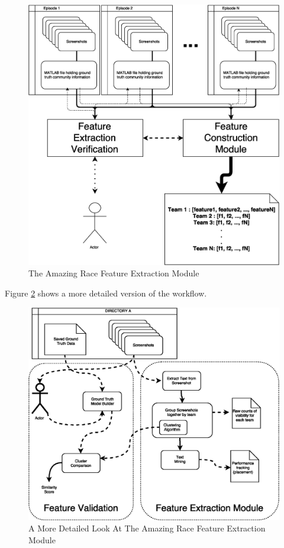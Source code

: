 \documentclass[10pt, twoside]{article}
\begin{document}
\label{section:FES}
\begin{figure}[H]
  \centering
  \includegraphics[width=\textwidth]{FeatureExtractionModule}
  \caption{The Amazing Race Feature Extraction Module}
  \label{fig:feature_extraction_module}
\end{figure}

Figure \ref{fig:feature_extraction_module_details} shows a more detailed version of the workflow.

\begin{figure}[H]
  \centering
  \includegraphics[width=\textwidth]{ExtractionDetails}
  \caption{A More Detailed Look At The Amazing Race Feature Extraction Module}
  \label{fig:feature_extraction_module_details}
\end{figure}
\end{document}
